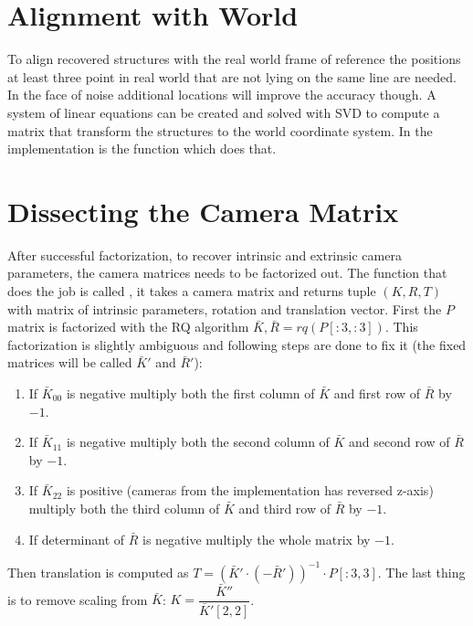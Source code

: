 \documentclass[12pt]{article}
\begin{document}
\section{Alignment with World}

To align recovered structures with the real world frame of reference the positions at least three point in real world that are not lying on the same line are needed. In the face of noise additional locations will improve the accuracy though. A system of linear equations can be created and solved with SVD to compute a matrix that transform the structures to the world coordinate system. In the implementation  is the function which does that.

\section{Dissecting the Camera Matrix}

After successful factorization, to recover intrinsic and extrinsic camera parameters, the camera matrices needs to be factorized out. The function that does the job is called , it takes a camera matrix and returns tuple $(K, R, T)$ with matrix of intrinsic parameters, rotation and translation vector. First the $P$ matrix is factorized with the RQ algorithm $\bar{K}, \bar{R} = rq(P[:3, :3])$. This factorization is slightly ambiguous and following steps are done to fix it (the fixed matrices will be called $\bar{K}'$ and $\bar{R}'$):

\begin{enumerate}
\item If $\bar{K}_{00}$ is negative multiply both the first column of $\bar{K}$ and first row of $\bar{R}$ by $-1$.
\item If $\bar{K}_{11}$ is negative multiply both the second column of $\bar{K}$ and second row of $\bar{R}$ by $-1$.
\item If $\bar{K}_{22}$ is positive (cameras from the implementation has reversed z-axis) multiply both the third column of $\bar{K}$ and third row of $\bar{R}$ by $-1$.
\item If determinant of $\bar{R}$ is negative multiply the whole matrix by $-1$.
\end{enumerate}

Then translation is computed as $T = (\bar{K}' \cdot (-\bar{R}'))^{-1} \cdot P[:3, 3]$. The last thing is to remove scaling from $\bar{K}$: $K = \dfrac{\bar{K}''}{\bar{K}'[2,2]}$.
\end{document}
